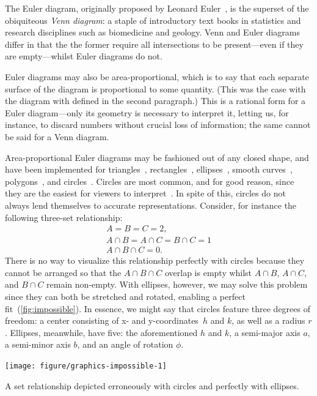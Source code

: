 \documentclass[
  a4paper,
  nofonts,
  nobib,
  nohyper,
  openany
]{tufte-book}\usepackage[]{graphicx}\usepackage[]{color}
\newenvironment{knitrout}{}{} %
\begin{document}
The Euler diagram, originally proposed by Leonard Euler~\citep{euler_1802}, is the superset of the obiquiteous \emph{Venn diagram}: a staple of introductory text books in statistics and research disciplines such as biomedicine and geology. Venn and Euler diagrams differ in that the the former require all intersections to be present---even if they are empty---whilst Euler diagrams do not.

Euler diagrams may also be area-proportional, which is to say that each separate surface of the diagram is proportional to some quantity. (This was the case with the diagram with defined in the second paragraph.) This is a rational form for a Euler diagram---only its geometry is necessary to interpret it, letting us, for instance, to discard numbers without crucial loss of information; the same cannot be said for a Venn diagram.

Area-proportional Euler diagrams may be fashioned out of any closed shape, and have been implemented for triangles~\citep{swinton_2011}, rectangles~\citep{swinton_2011}, ellipses~\citep{micallef_2014}, smooth curves~\citep{micallef_2014b}, polygons~\citep{swinton_2011}, and circles~\citep{wilkinson_2012,kestler_2008,swinton_2011}. Circles are most common, and for good reason, since they are the easiest for viewers to interpret~\citep{blake_2016}. In spite of this, circles do not always lend themselves to accurate representations. Consider, for instance the following three-set relationship:
\[
\begin{gathered}
A = B = C = 2,\\
A \cap B = A \cap C = B \cap C = 1\\
A \cap B \cap C = 0.
\end{gathered}
\]
There is no way to visualize this relationship perfectly with circles because they cannot be arranged so that the $A \cap B \cap C$ overlap is empty whilst $A \cap B$, $A \cap C$, and $B \cap C$ remain non-empty. With ellipses, however, we may solve this problem since they can both be stretched and rotated, enabling a perfect fit~(\cref{fig:impossible}). In essence, we might say that circles feature three degrees of freedom: a center consisting of x- and y-coordinates~$h$ and $k$, as well as a radius $r$. Ellipses, meanwhile, have five: the aforementioned $h$ and $k$, a semi-major axis $a$, a semi-minor axis $b$, and an angle of rotation $\phi$.

\begin{marginfigure}
\begin{knitrout}
\color{fgcolor}

{\centering \texttt{[image: figure/graphics-impossible-1]} 

}



\end{knitrout}
\caption{A set relationship depicted erroneously with circles and perfectly with ellipses.}
\label{fig:impossible}
\end{marginfigure}
\end{document}
